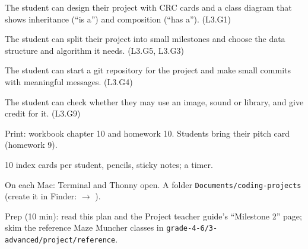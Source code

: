 
\begin{objectives}
  \item The student can design their project with CRC cards and a class diagram that shows inheritance (\enquote{is a}) and composition (\enquote{has a}). (L3.G1)
  \item The student can split their project into small milestones and choose the data structure and algorithm it needs. (L3.G5, L3.G3)
  \item The student can start a git repository for the project and make small commits with meaningful messages. (L3.G4)
  \item The student can check whether they may use an image, sound or library, and give credit for it. (L3.G9)
\end{objectives}

\begin{materials}
  \item Print: workbook chapter 10 and homework 10. Students bring their pitch card (homework 9).
  \item 10 index cards per student, pencils, sticky notes; a timer.
  \item On each Mac: Terminal and Thonny open. A folder \texttt{Documents/coding-projects} (create it in Finder:  $\rightarrow$ ).
  \item Prep (10 min): read this plan and the Project teacher guide's \enquote{Milestone 2} page; skim the reference Maze Muncher classes in \texttt{grade-4-6/3-advanced/project/reference}.
\end{materials}

\begin{timeplan}
\end{timeplan}

